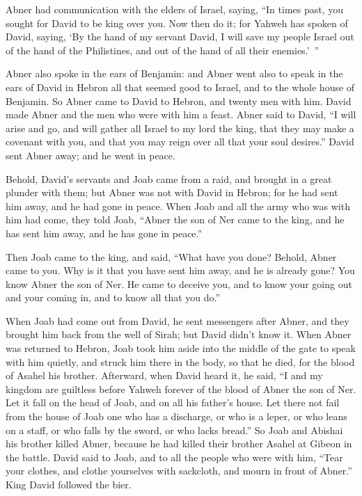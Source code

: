 {Abner had communication with the elders of Israel, saying, “In times past, you sought for David to be king over you.
Now then do it; for Yahweh has spoken of David, saying, ‘By the hand of my servant David, I will save my people Israel out of the hand of the Philistines, and out of the hand of all their enemies.’ ”
\par }{\PP {}Abner also spoke in the ears of Benjamin: and Abner went also to speak in the ears of David in Hebron all that seemed good to Israel, and to the whole house of Benjamin.
So Abner came to David to Hebron, and twenty men with him. David made Abner and the men who were with him a feast.
Abner said to David, “I will arise and go, and will gather all Israel to my lord the king, that they may make a covenant with you, and that you may reign over all that your soul desires.” David sent Abner away; and he went in peace.
\par }{\PP {}Behold, David’s servants and Joab came from a raid, and brought in a great plunder with them; but Abner was not with David in Hebron; for he had sent him away, and he had gone in peace.
When Joab and all the army who was with him had come, they told Joab, “Abner the son of Ner came to the king, and he has sent him away, and he has gone in peace.”
\par }{\PP {}Then Joab came to the king, and said, “What have you done? Behold, Abner came to you. Why is it that you have sent him away, and he is already gone?
You know Abner the son of Ner. He came to deceive you, and to know your going out and your coming in, and to know all that you do.”
\par }{\PP {}When Joab had come out from David, he sent messengers after Abner, and they brought him back from the well of Sirah; but David didn’t know it.
When Abner was returned to Hebron, Joab took him aside into the middle of the gate to speak with him quietly, and struck him there in the body, so that he died, for the blood of Asahel his brother.
Afterward, when David heard it, he said, “I and my kingdom are guiltless before Yahweh forever of the blood of Abner the son of Ner.
Let it fall on the head of Joab, and on all his father’s house. Let there not fail from the house of Joab one who has a discharge, or who is a leper, or who leans on a staff, or who falls by the sword, or who lacks bread.”
So Joab and Abishai his brother killed Abner, because he had killed their brother Asahel at Gibeon in the battle.
David said to Joab, and to all the people who were with him, “Tear your clothes, and clothe yourselves with sackcloth, and mourn in front of Abner.” King David followed the bier.
}
